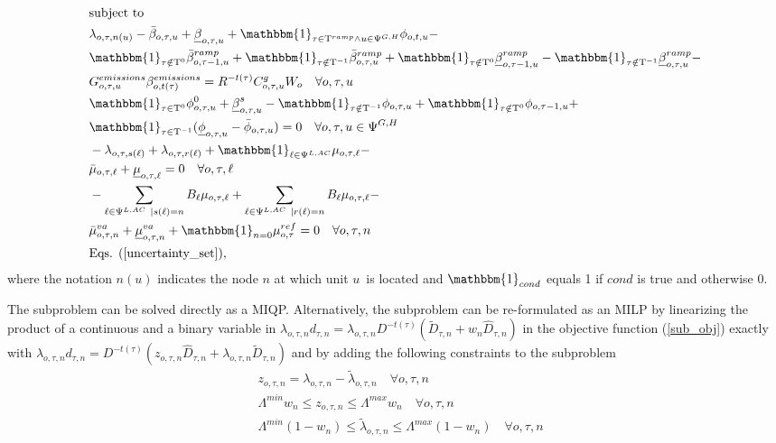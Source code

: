\documentclass[final]{IEEEtran}
\newcommand{\Tau}{\mathrm{T}}
\begin{document}
\begin{align}
&\text{subject to} \nonumber \\
&\lambda_{o, \tau, n(u)} - \bar{\beta}_{o, \tau, u} + \underline{\beta}_{o, \tau, u} + \mathbbm{1}_{\tau \in \Tau^{ramp} \land u \in \Psi^{G, H}} \phi_{o, t, u} - \nonumber \\
&\mathbbm{1}_{\tau \notin \Tau^0} \bar{\beta}_{o, \tau - 1, u}^{ramp} + \mathbbm{1}_{\tau \notin \Tau^{-1}} \bar{\beta}_{o, \tau, u}^{ramp} + \mathbbm{1}_{\tau \notin \Tau^0} \underline{\beta}_{o, \tau - 1, u}^{ramp} - \mathbbm{1}_{\tau \notin \Tau^{-1}} \underline{\beta}_{o, \tau, u}^{ramp} - \nonumber \\
&\label{sub_constr1}G_{o, \tau, u}^{emissions} \beta_{o, t(\tau)}^{emissions} = R^{-t(\tau)} C^g_{o, \tau, u}  W_o \quad \forall o, \tau, u \\
&\mathbbm{1}_{\tau \in \Tau^0} \phi_{o, \tau, u}^{0} + \underline{\beta}_{o, \tau, u}^s - \mathbbm{1}_{\tau \notin \Tau^{-1}} \phi_{o, \tau, u} + \mathbbm{1}_{\tau \notin \Tau^0} \phi_{o, \tau - 1, u} + \nonumber \\
&\mathbbm{1}_{\tau \in \Tau^{-1}} (\underline{\phi}_{o, \tau, u} - \bar{\phi}_{o, \tau, u}) = 0 \quad \forall o, \tau, u \in \Psi^{G, H} \\
&-\lambda_{o, \tau, s(\ell)} + \lambda_{o, \tau, r(\ell)} + \mathbbm{1}_{\ell \in \Psi^{L,AC}} \mu_{o, \tau, \ell} - \nonumber \\
&\bar{\mu}_{o, \tau, \ell} + \underline{\mu}_{o, \tau, \ell} = 0 \quad \forall o, \tau, \ell \\
&-\sum\limits_{\ell \in \Psi^{L,AC} | s(\ell) = n} B_\ell \mu_{o, \tau, \ell} + \sum\limits_{\ell \in \Psi^{L,AC} | r(\ell) = n} B_\ell \mu_{o, \tau, \ell} - \nonumber \\
&\bar{\mu}^{va}_{o, \tau, n} + \underline{\mu}^{va}_{o, \tau, n} + \mathbbm{1}_{n = 0} \mu^{ref}_{o, \tau} = 0 \quad \forall o, \tau, n \\
&\label{sub_last}\text{Eqs. } (\ref{uncertainty_set}),
\end{align}
where the notation $n(u)$ indicates the node $n$ at which unit $u$ is located and $\mathbbm{1}_{cond}$ equals 1 if $cond$ is true and otherwise 0.

The subproblem can be solved directly as a MIQP. Alternatively, the subproblem can be re-formulated as an MILP by linearizing the product of a continuous and a binary variable in $\lambda_{o, \tau, n} d_{\tau, n} = \lambda_{o, \tau, n} D^{-t(\tau)} (\tilde{D}_{\tau, n} + w_n \hat{D}_{\tau, n})$ in the objective function (\ref{sub_obj}) exactly with $\lambda_{o, \tau, n} d_{\tau, n} = D^{-t(\tau)} (z_{o, \tau, n} \hat{D}_{\tau, n} + \lambda_{o, \tau, n} \tilde{D}_{\tau, n})$ and by adding the following constraints to the subproblem
\begin{align}
&\label{z_constr} z_{o, \tau, n} = \lambda_{o, \tau, n} - \tilde{\lambda}_{o, \tau, n} \quad \forall o, \tau, n \\
&\Lambda^{min} w_n \leq z_{o, \tau, n} \leq \Lambda^{max} w_n \quad \forall o, \tau, n \\
&\Lambda^{min} (1 - w_n) \leq \tilde{\lambda}_{o, \tau, n} \leq \Lambda^{max} (1 - w_n) \quad \forall o, \tau, n
\end{align}
\end{document}
